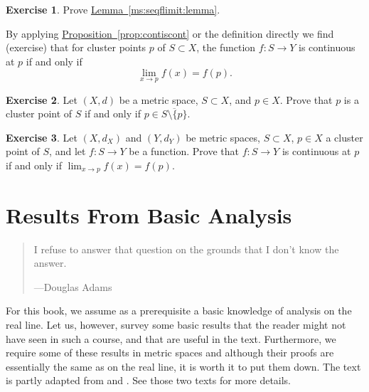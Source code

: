 \documentclass[12pt,openany]{book}
\theoremstyle{plain}
\theoremstyle{remark}
\theoremstyle{definition}
\newenvironment{exbox}{%
    \def\FrameCommand{\vrule width 1pt \relax\hspace{10pt}}%
    \MakeFramed{\advance\hsize-\width\FrameRestore}%
}{%
    \endMakeFramed
}
\newenvironment{myepigraph}{%
    \begin{quote}%
    \begingroup\itshape
}{%
    \endgroup%
    \end{quote}
}
\theoremstyle{exercise}
\newtheorem{exercise}{Exercise}[section]
\theoremstyle{example}
\newcommand{\propref}[1]{\hyperref[#1]{Proposition~\ref*{#1}}}
\newcommand{\lemmaref}[1]{\hyperref[#1]{Lemma~\ref*{#1}}}
\begin{document}
\begin{exbox}
\begin{exercise}
Prove \lemmaref{ms:seqflimit:lemma}.
\end{exercise}
\end{exbox}

By applying \propref{prop:contiscont} or the definition directly we find
(exercise) that for cluster points $p$ of $S
\subset X$, the function
$f \colon S \to Y$ is continuous at $p$ if and only if
\begin{equation*}
\lim_{x \to p} f(x) = f(p) .
\end{equation*}

\begin{exbox}
\begin{exercise}
Let $(X,d)$ be a metric space, $S \subset X$, and $p \in X$.  Prove that
$p$ is a cluster point of $S$ if and only if $p \in \overline{S \setminus \{
p \}}$.
\end{exercise}

\begin{exercise}
Let $(X,d_X)$ and $(Y,d_Y)$ be metric spaces, $S \subset X$, $p \in X$
a cluster point of $S$, and let $f \colon S \to Y$ be a function.
Prove that
$f \colon S \to Y$ is continuous at $p$ if and only if
$\lim_{x \to p} f(x) = f(p)$.
\end{exercise}
\end{exbox}


\chapter{Results From Basic Analysis} \label{ap:basicanal}

\begin{myepigraph}
I refuse to answer that question on the grounds that I don't know the
answer.

---Douglas Adams
\end{myepigraph}

For this book,
we assume as a prerequisite a basic knowledge of analysis on the real line.
Let us, however, survey some basic results that the reader might not have
seen in such a course, and that are useful in the text.  Furthermore,
we require some of these results in metric spaces and although their proofs
are essentially the same as on the real line, it is worth it to put them down.
The text is partly adapted from \cite{ra:book} and \cite{ra:book2}.
See those two texts for more details.
\end{document}
